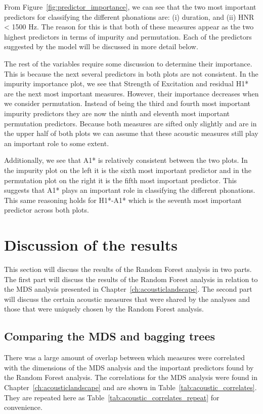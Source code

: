 From Figure~\ref{fig:predictor_importance}, we can see that the two most important predictors for classifying the different phonations are: (i) duration, and (ii) HNR < 1500 Hz. The reason for this is that both of these measures appear as the two highest predictors in terms of impurity and permutation. Each of the predictors suggested by the model will be discussed in more detail below. 

The rest of the variables require some discussion to determine their importance. This is because the next several predictors in both plots are not consistent. In the impurity importance plot, we see that Strength of Excitation and residual H1* are the next most important measures. However, their importance decreases when we consider permutation. Instead of being the third and fourth most important impurity predictors they are now the ninth and eleventh most important permutation predictors. Because both measures are sifted only slightly and are in the upper half of both plots we can assume that these acoustic measures still play an important role to some extent.

Additionally, we see that A1* is relatively consistent between the two plots. In the impurity plot on the left it is the sixth most important predictor and in the permutation plot on the right it is the fifth most important predictor. This suggests that A1* plays an important role in classifying the different phonations. This same reasoning holds for H1*-A1* which is the seventh most important predictor across both plots. 

\section{Discussion of the results} \label{sec:dt_discussion}

This section will discuss the results of the Random Forest analysis in two parts. The first part will discuss the results of the Random Forest analysis in relation to the MDS analysis presented in Chapter~\ref{ch:acousticlandscape}. The second part will discuss the certain acoustic measures that were shared by the analyses and those that were uniquely chosen by the Random Forest analysis. 
\subsection{Comparing the MDS and bagging trees} \label{sec:dt_mds}
There was a large amount of overlap between which measures were correlated with the dimensions of the MDS analysis and the important predictors found by the Random Forest analysis. The correlations for the MDS analysis were found in Chapter~\ref{ch:acousticlandscape} and are shown in Table~\ref{tab:acoustic_correlates}. They are repeated here as Table~\ref{tab:acoustic_correlates_repeat} for convenience.  

